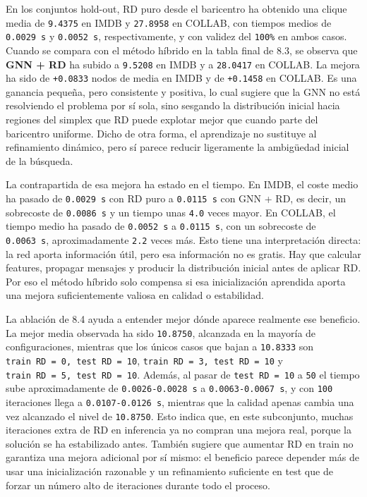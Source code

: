 \documentclass[11pt]{article}
\begin{document}
En los conjuntos hold-out, RD puro desde el baricentro ha obtenido una
clique media de \texttt{9.4375} en IMDB y \texttt{27.8958} en COLLAB,
con tiempos medios de \texttt{0.0029\ s} y \texttt{0.0052\ s},
respectivamente, y con validez del \texttt{100\%} en ambos casos. Cuando
se compara con el método híbrido en la tabla final de 8.3, se observa
que \textbf{GNN + RD} ha subido a \texttt{9.5208} en IMDB y a
\texttt{28.0417} en COLLAB. La mejora ha sido de \texttt{+0.0833} nodos
de media en IMDB y de \texttt{+0.1458} en COLLAB. Es una ganancia
pequeña, pero consistente y positiva, lo cual sugiere que la GNN no está
resolviendo el problema por sí sola, sino sesgando la distribución
inicial hacia regiones del simplex que RD puede explotar mejor que
cuando parte del baricentro uniforme. Dicho de otra forma, el
aprendizaje no sustituye al refinamiento dinámico, pero sí parece
reducir ligeramente la ambigüedad inicial de la búsqueda.

La contrapartida de esa mejora ha estado en el tiempo. En IMDB, el coste
medio ha pasado de \texttt{0.0029\ s} con RD puro a \texttt{0.0115\ s}
con GNN + RD, es decir, un sobrecoste de \texttt{0.0086\ s} y un tiempo
unas \texttt{4.0} veces mayor. En COLLAB, el tiempo medio ha pasado de
\texttt{0.0052\ s} a \texttt{0.0115\ s}, con un sobrecoste de
\texttt{0.0063\ s}, aproximadamente \texttt{2.2} veces más. Esto tiene
una interpretación directa: la red aporta información útil, pero esa
información no es gratis. Hay que calcular features, propagar mensajes y
producir la distribución inicial antes de aplicar RD. Por eso el método
híbrido solo compensa si esa inicialización aprendida aporta una mejora
suficientemente valiosa en calidad o estabilidad.

La ablación de 8.4 ayuda a entender mejor dónde aparece realmente ese
beneficio. La mejor media observada ha sido \texttt{10.8750}, alcanzada
en la mayoría de configuraciones, mientras que los únicos casos que
bajan a \texttt{10.8333} son \texttt{train\ RD\ =\ 0,\ test\ RD\ =\ 10},
\texttt{train\ RD\ =\ 3,\ test\ RD\ =\ 10} y
\texttt{train\ RD\ =\ 5,\ test\ RD\ =\ 10}. Además, al pasar de
\texttt{test\ RD\ =\ 10} a \texttt{50} el tiempo sube aproximadamente de
\texttt{0.0026-0.0028\ s} a \texttt{0.0063-0.0067\ s}, y con
\texttt{100} iteraciones llega a \texttt{0.0107-0.0126\ s}, mientras que
la calidad apenas cambia una vez alcanzado el nivel de \texttt{10.8750}.
Esto indica que, en este subconjunto, muchas iteraciones extra de RD en
inferencia ya no compran una mejora real, porque la solución se ha
estabilizado antes. También sugiere que aumentar RD en train no
garantiza una mejora adicional por sí mismo: el beneficio parece
depender más de usar una inicialización razonable y un refinamiento
suficiente en test que de forzar un número alto de iteraciones durante
todo el proceso.
\end{document}
